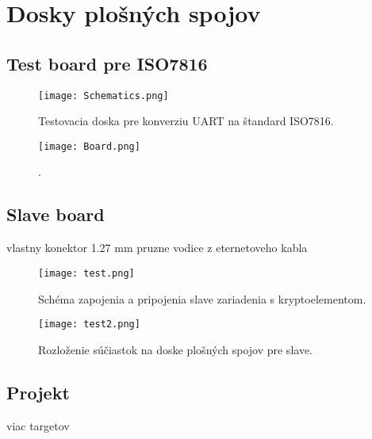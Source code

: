 \documentclass[12pt,a4wide,oneside,openright]{report}
\begin{document}
\section{Dosky plošných spojov}
\subsection{Test board pre ISO7816}

\begin{figure*}[h]
	\centering
	\texttt{[image: Schematics.png]}
	\caption{Testovacia doska pre konverziu UART na štandard ISO7816.}
	\label{f:board_ISO_schematic}
\end{figure*}

\begin{figure*}[h]
	\centering
	\texttt{[image: Board.png]}
	\caption{.}
	\label{f:board_ISO_layout}
\end{figure*}

\subsection{Slave board}

vlastny konektor 
1.27 mm
pruzne
vodice z eternetoveho kabla

\begin{figure*}[h]
	\centering
	\texttt{[image: test.png]}
	\caption{Schéma zapojenia a pripojenia slave zariadenia s kryptoelementom.}
	\label{f:board_slave_schematic}
\end{figure*}

\begin{figure*}[h]
	\centering
	\texttt{[image: test2.png]}
	\caption{Rozloženie súčiastok na doske plošných spojov pre slave.}
	\label{f:board_slave_layout}
\end{figure*}

\subsection{Projekt}
viac targetov

\end{document}
